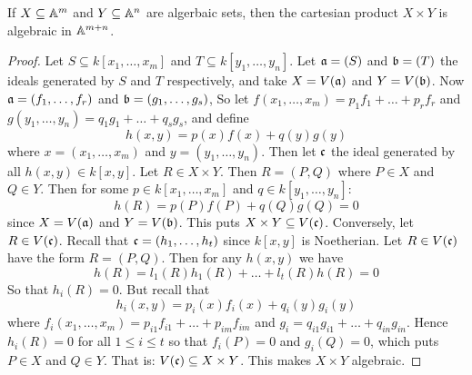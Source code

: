 \begin{proposition}\label{proposition_10.1.4}
  If $X \subseteq \A^m$ and $Y \subseteq \A^n$ are algerbaic sets,
  then the cartesian product $X \times Y$ is algebraic in $\A^{m+n}$.
\end{proposition}
\begin{proof}
  Let $S \subseteq k[x_1, \dots, x_m]$ and $T \subseteq k[y_1, \dots,
  y_n]$. Let $\af=(S)$ and $\bf=(T)$ the ideals generated by $S$
  and $T$ respectively, and take $X=V(\af)$ and $Y=V(\bf)$. Now
  $\af=(f_1, \dots, f_r)$ and $\bf=(g_1, \dots, g_s)$, So let
  $f(x_1, \dots, x_m)=p_1f_1+\dots+p_rf_r$ and
  $g(y_1, \dots, y_n)=q_1g_1+\dots+q_sg_s$, and define
  \begin{equation*}
    h(x,y)=p(x)f(x)+q(y)g(y)
  \end{equation*}
  where $x=(x_1, \dots, x_m)$ and $y=(y_1, \dots, y_n)$. Then let
  $\cf$ the ideal generated by all $h(x,y) \in k[x,y]$. Let $R \in X
  \times Y$. Then $R=(P,Q)$ where $P \in X$ and $Q \in Y$. Then for
  some $p \in k[x_1, \dots, x_m]$ and $q \in k[y_1, \dots, y_n]$:
  \begin{equation*}
    h(R)=p(P)f(P)+q(Q)g(Q)=0
  \end{equation*}
  since $X=V(\af)$ and $Y=V(\bf)$. This puts $X \times Y \subseteq
  V(\cf)$. Conversely, let $R \in V(\cf)$. Recall that $\cf=(h_1,
  \dots, h_t)$ since $k[x,y]$ is Noetherian. Let $R \in V(\cf)$ have
  the form $R=(P,Q)$. Then for any $h(x,y)$ we have
  \begin{equation*}
    h(R)=l_1(R)h_1(R)+\dots+l_t(R)h(R)=0
  \end{equation*}
  So that $h_i(R)=0$. But recall that
  \begin{equation*}
    h_i(x,y)=p_i(x)f_i(x)+q_i(y)g_i(y)
  \end{equation*}
  where $f_i(x_1, \dots, x_m)=p_{i1}f_{i1}+\dots+p_{im}f_{im}$ and
  $g_i=q_{i1}g_{i1}+\dots+q_{in}g_{in}$. Hence $h_i(R)=0$ for all $1
  \leq i \leq t$ so that $f_i(P)=0$ and $g_i(Q)=0$, which puts $P \in
  X$ and $Q \in Y$. That is: $V(\cf) \subseteq X \times Y$. This makes
  $X \times Y$ algebraic.
\end{proof}
